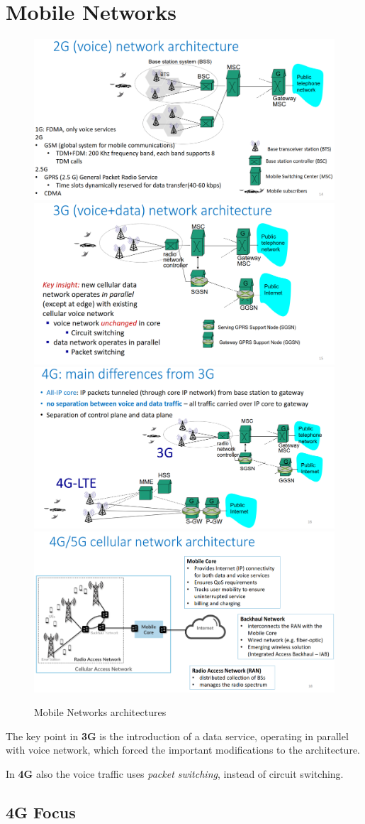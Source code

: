 \chapter{Mobile Networks}
\begin{figure}[htbp]
   \centering
   \includegraphics[width=0.45\columnwidth]{images/2g_architecture.png}
   \includegraphics[width=0.45\columnwidth]{images/3g_architecture.png}\\
   \includegraphics[width=0.45\columnwidth]{images/4g_architecture_3gcomp.png}
   \includegraphics[width=0.45\columnwidth]{images/5g_architecture.png}

   \caption{Mobile Networks architectures}
   \label{fig:mobile_architectures}
\end{figure}

The key point in \textbf{3G} is the introduction of a data service, operating in parallel with voice network, which forced the important modifications to the architecture.

In \textbf{4G} also the voice traffic uses \textit{packet switching}, instead of circuit switching.

\section{4G Focus}

